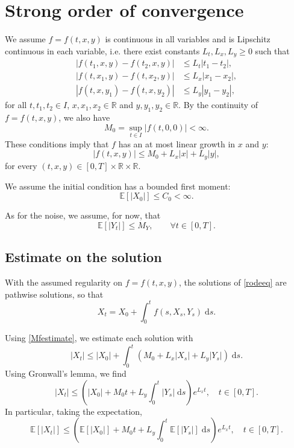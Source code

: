 \documentclass[reqno,12pt]{amsart}
\theoremstyle{plain}%
\theoremstyle{definition}
\begin{document}
\section{Strong order of convergence}

We assume $f=f(t, x, y)$ is continuous in all variables and is Lipschitz continuous in each variable, i.e. there exist constants $L_t, L_x, L_y \geq 0$ such that
\begin{align}
  \label{Ltassumption} |f(t_1, x, y) - f(t_2, x, y)| & \leq L_t |t_1-t_2|, \\
  \label{Lxassumption} |f(t, x_1, y) - f(t, x_2, y)| & \leq L_x |x_1 - x_2|, \\
  \label{Lyassumption} |f(t, x, y_1) - f(t, x, y_2)| & \leq L_y |y_1 - y_2|,
\end{align}
for all $t, t_1, t_2 \in I$, $x, x_1, x_2 \in \mathbb{R}$ and $y, y_1, y_2\in \mathbb{R}$. By the continuity of $f=f(t, x, y)$, we also have
$$
M_0 = \sup_{t\in I} |f(t, 0, 0)| < \infty.
$$
These conditions imply that $f$ has an at most linear growth in $x$ and $y$:
\begin{equation}
    \label{Mfestimate}
    |f(t, x, y)| \leq M_0 + L_x|x| + L_y|y|,
\end{equation}
for every $(t, x, y) \in [0, T] \times \mathbb{R} \times \mathbb{R}$.

We assume the initial condition has a bounded first moment:
\begin{equation}
    \label{EX0assumption}
    \mathbb{E}[|X_0|] \leq C_0 < \infty.
\end{equation}

As for the noise, we assume, for now, that
\begin{equation}
    \label{EYtassumption}
    \mathbb{E}[|Y_t|] \leq M_Y, \qquad \forall t\in [0, T].
\end{equation}

\subsection{Estimate on the solution}

With the assumed regularity on $f=f(t, x, y)$, the solutions of \eqref{rodeeq} are pathwise solutions, so that
$$
X_t = X_0 + \int_0^t f(s, X_s, Y_s) \;\mathrm{d}s.
$$

Using \eqref{Mfestimate}, we estimate each solution with
$$
    |X_t|  \leq |X_0| + \int_0^t (M_0 + L_x |X_s| + L_y |Y_s|) \;\mathrm{d}s.
$$
Using Gronwall's lemma, we find
\begin{equation}
    \label{Xtestimate}
    |X_t| \leq \left( |X_0| + M_0 t  + L_y \int_0^t |Y_s| \;\mathrm{d}s\right) e^{L_x t}, \quad t \in [0, T].
\end{equation}
In particular, taking the expectation, 
$$
    \mathbb{E}[|X_t|] \leq \left( \mathbb{E}[|X_0|] + M_0 t  + L_y \int_0^t \mathbb{E}[|Y_s|] \;\mathrm{d}s\right) e^{L_x t}, \quad t \in [0, T].
$$
\end{document}
